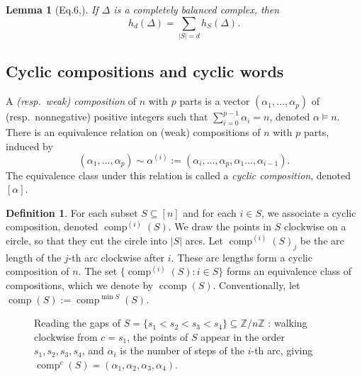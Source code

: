 \documentclass[10pt,a4paper]{amsart}
\theoremstyle{plain}
\newtheorem{lemma}[theorem]{Lemma}
\theoremstyle{definition}
\newtheorem{definition}[theorem]{Definition}
\newcommand{\Z}{\mathbb{Z}}
\DeclareMathOperator{\comp}{comp}
\DeclareMathOperator{\ccomp}{ccomp}
\begin{document}
\begin{lemma}[Eq.6,\cite{Stanley1979}]
	If $\Delta$ is a completely balanced complex, then
	\begin{equation}\label{eq:flagh}
		h_d(\Delta)=\sum_{|S|=d} h_S(\Delta).
	\end{equation}
\end{lemma}

\subsection{Cyclic compositions and cyclic words}
A \emph{(resp.\ weak) composition} of $n$ with $p$ parts is a vector $(\alpha_1,\dots,\alpha_p)$ of (resp.\
nonnegative) positive integers such that $\sum_{i=0}^{p-1}\alpha_i = n$, denoted $\alpha \models n$. There is an
equivalence relation on (weak) compositions of $ n $ with $ p $ parts, induced by
\[
	(\alpha_1,\dots,\alpha_p) \sim \alpha^{(i)}:= (\alpha_i,\dots,\alpha_p,\alpha_1\dots,\alpha_{i-1}).
\]
The equivalence class under this relation is called a \emph{cyclic composition}, denoted $ [\alpha] $.

\begin{definition}
	For each subset $ S \subseteq [n] $ and for each $i \in S$, we associate a cyclic composition, denoted
	$\comp^{(i)}(S)$. We draw the points in $S$ clockwise on a circle, so that they cut the circle into $ |S| $ arcs. Let
	$\comp^{(i)}(S)_j$ be the arc length of the $j$-th arc clockwise after $i$. These arc lengths form a cyclic composition
	of $n$. The set $\{\comp^{(i)}(S): i \in S\}$ forms an equivalence class of compositions, which we denote by $\ccomp(S)$.
	Conventionally, let $\comp(S):= \comp^{\min S}(S)$.
\end{definition}

\begin{figure}
	\centering
	\caption{Reading the gaps of $
			S=\{s_1<s_2<s_3<s_4\}\subseteq\Z/n\Z $
: walking clockwise from $ c=s_1 $, the points of $ S $ appear in the order $ s_1,s_2,s_3,s_4 $, and $ \alpha_i $
		is the number of steps of the $ i $-th arc, giving $
			\comp^{c}(S)=(\alpha_1,\alpha_2,\alpha_3,\alpha_4)$.}\label{fig:comp}
\end{figure}
\end{document}

